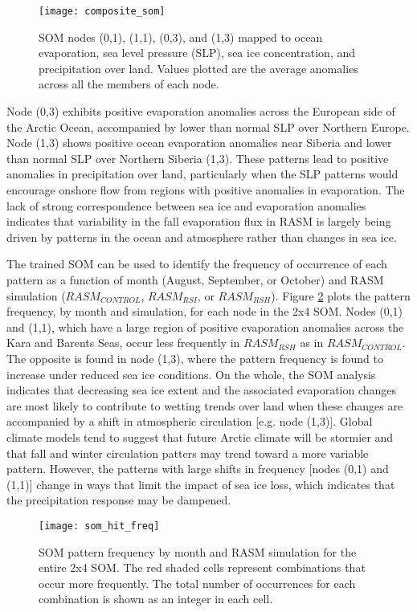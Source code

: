 \begin{figure}
  \centering
  \texttt{[image: composite\_som]}
  \caption{SOM nodes (0,1), (1,1), (0,3), and (1,3) mapped to ocean evaporation, sea level pressure (SLP), sea ice concentration, and precipitation over land. Values plotted are the average anomalies across all the members of each node.}
  \label{fig:composite_som}
\end{figure}

Node (0,3) exhibits positive evaporation anomalies across the European side of the Arctic Ocean, accompanied by lower than normal SLP over Northern Europe.
Node (1,3) shows positive ocean evaporation anomalies near Siberia and lower than normal SLP over Northern Siberia (1,3).
These patterns lead to positive anomalies in precipitation over land, particularly when the SLP patterns would encourage onshore flow from regions with positive anomalies in evaporation.
The lack of strong correspondence between sea ice and evaporation anomalies indicates that variability in the fall evaporation flux in RASM is largely being driven by patterns in the ocean and atmosphere rather than changes in sea ice.

The trained SOM can be used to identify the frequency of occurrence of each pattern as a function of month (August, September, or October) and RASM simulation ($RASM_{CONTROL}$, $RASM_{RSI}$, or $RASM_{RSH}$).
Figure \ref{fig:som_hit_freq} plots the pattern frequency, by month and simulation, for each node in the 2x4 SOM.
Nodes (0,1) and (1,1), which have a large region of positive evaporation anomalies across the Kara and Barents Seas, occur less frequently in $RASM_{RSH}$ as in $RASM_{CONTROL}$.
The opposite is found in node (1,3), where the pattern frequency is found to increase under reduced sea ice conditions.
On the whole, the SOM analysis indicates that decreasing sea ice extent and the associated evaporation changes are most likely to contribute to wetting trends over land when these changes are accompanied by a shift in atmospheric circulation [e.g. node (1,3)].
Global climate models tend to suggest that future Arctic climate will be stormier \citep{Vavrus_2012} and that fall and winter circulation patters may trend toward a more variable pattern.
However, the patterns with large shifts in frequency [nodes (0,1) and (1,1)] change in ways that limit the impact of sea ice loss, which indicates that the precipitation response may be dampened.

\begin{figure}
  \centering
  \texttt{[image: som\_hit\_freq]}
  \caption{SOM pattern frequency by month and RASM simulation for the entire 2x4 SOM. The red shaded cells represent combinations that occur more frequently. The total number of occurrences for each combination is shown as an integer in each cell.}
  \label{fig:som_hit_freq}
\end{figure}

